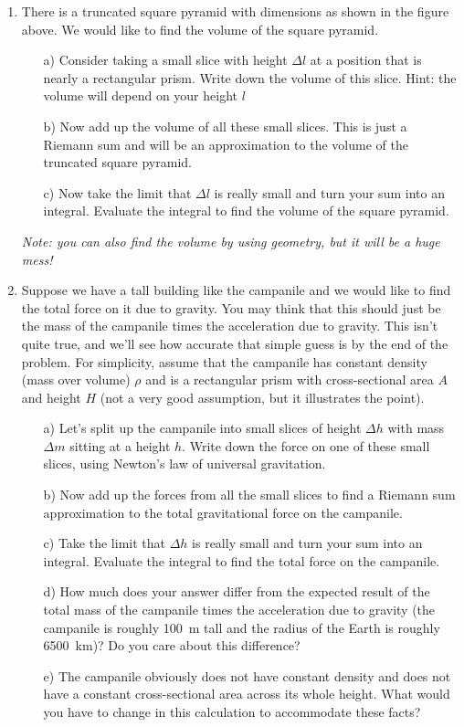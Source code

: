 \documentclass[12pt]{book}
\begin{document}
\begin{enumerate}
 \item There is a truncated square pyramid with dimensions as shown in the figure above. We would like to find the volume of the square pyramid.
 \begin{enumerate}
 \item[a)] Consider taking a small slice with height $\Delta l$ at a position that is nearly a rectangular prism. Write down the volume of this slice. Hint: the volume will depend on your height $l$ 
 \item[b)] Now add up the volume of all these small slices. This is just a Riemann sum and will be an approximation to the volume of the truncated square pyramid.
 \item[c)] Now take the limit that $\Delta l$ is really small and turn your sum into an integral. Evaluate the integral to find the volume of the square pyramid.
 \end{enumerate}
 {\it Note: you can also find the volume by using geometry, but it will be a huge mess!}
 
 \item Suppose we have a tall building like the campanile and we would like to find the total force on it due to gravity. You may think that this should just be the mass of the campanile times the acceleration due to gravity. This isn't quite true, and we'll see how accurate that simple guess is by the end of the problem. For simplicity, assume that the campanile has constant density (mass over volume) $\rho$ and is a rectangular prism with cross-sectional area $A$ and height $H$ (not a very good assumption, but it illustrates the point).

 \begin{enumerate}
 \item[a)] Let's split up the campanile into small slices of height $\Delta h$ with mass $\Delta m$ sitting at a height $h.$ Write down the force on one of these small slices, using Newton's law of universal gravitation.
 \item[b)] Now add up the forces from all the small slices to find a Riemann sum approximation to the total gravitational force on the campanile.
 \item[c)] Take the limit that $\Delta h$ is really small and turn your sum into an integral. Evaluate the integral to find the total force on the campanile.
 \item[d)] How much does your answer differ from the expected result of the total mass of the campanile times the acceleration due to gravity (the campanile is roughly 100~m tall and the radius of the Earth is roughly 6500~km)? Do you care about this difference?
 \item[e)] The campanile obviously does not have constant density and does not have a constant cross-sectional area across its whole height. What would you have to change in this calculation to accommodate these facts?
 \end{enumerate}
\end{enumerate}
\end{document}
